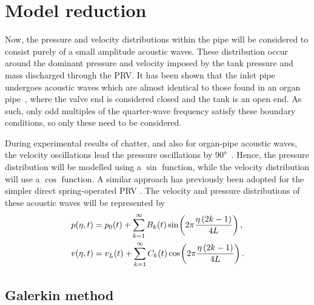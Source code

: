 \section{Model reduction}

Now, the pressure and velocity distributions within the pipe will be considered to consist purely of a small amplitude acoustic waves. These distribution occur around the dominant pressure and velocity imposed by the tank pressure and mass discharged through the PRV. It has been shown that the inlet pipe undergoes acoustic waves which are almost identical to those found in an organ pipe~\cite{Botros1997Riser-ReliefInteractions}, where the valve end is considered closed and the tank is an open end. As such, only odd multiples of the quarter-wave frequency satisfy these boundary conditions, so only these need to be considered.

During experimental results of chatter, and also for organ-pipe acoustic waves, the velocity oscillations lead the pressure oscillations by $90^o$~\cite{Hos2015DynamicModelling}. Hence, the pressure distribution will be modelled using a $\sin$ function, while the velocity distribution will use a $\cos$ function. A similar approach has previously been adopted for the simpler direct spring-operated PRV \cite{Hos2016DynamicService,Hos2015ModelPipe}. The velocity and pressure distributions of these acoustic waves will be represented by
~
\begin{equation} \label{eq: PressVelDist}
\begin{split}
    p(\eta,t) &= p_0(t) + \sum^{\infty}_{k=1} B_k(t) \, \fun{sin}{2\pi \frac{\eta \left( 2 k - 1 \right)}{4L}} \, ,\\
    v(\eta,t) &= v_L(t) + \sum_{k=1}^{\infty} C_k(t) \, \fun{cos}{2\pi \frac{\eta \left( 2 k - 1 \right)}{4L}} \, .
\end{split}
\end{equation}

\subsection{Galerkin method} \label{subsec: Galerkin}

